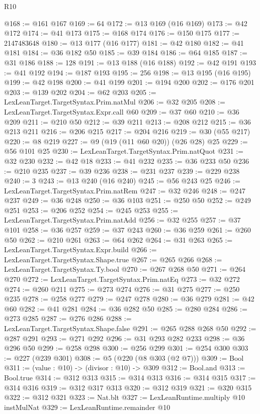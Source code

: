 \begin{lexlean}{R10}
\begin{coremodule}
@168 := @161 @167
@169 := 64
@172 := @13 @169 (@16 @169)
@173 := @42 @172
@174 := @41 @173
@175 := @168 @174
@176 := @150 @175
@177 := 2147483648
@180 := @13 @177 (@16 @177)
@181 := @42 @180
@182 := @41 @181
@184 := @36 @182 @50
@185 := @39 @184
@186 := @64 @185
@187 := @31 @186
@188 := 128
@191 := @13 @188 (@16 @188)
@192 := @42 @191
@193 := @41 @192
@194 := @187 @193
@195 := 256
@198 := @13 @195 (@16 @195)
@199 := @42 @198
@200 := @41 @199
@201 := @194 @200
@202 := @176 @201
@203 := @139 @202
@204 := @62 @203
@205 := LexLeanTarget.TargetSyntax.Prim.natMul
@206 := @32 @205
@208 := LexLeanTarget.TargetSyntax.Expr.call @60
@209 := @37 @60
@210 := @36 @209
@211 := @210 @50
@212 := @39 @211
@213 := @208 @212
@215 := @36 @213 @211
@216 := @206 @215
@217 := @204 @216
@219 := @30 (@55 @217)
@220 := @8 @219
@227 := @9 (@19 (@11 @60 @20)) (@26 @28) @25
@229 := @56 @101 @25
@230 := LexLeanTarget.TargetSyntax.Prim.natQuot
@231 := @32 @230
@232 := @42 @18
@233 := @41 @232
@235 := @36 @233 @50
@236 := @210 @235
@237 := @39 @236
@238 := @231 @237
@239 := @229 @238
@240 := 3
@243 := @13 @240 (@16 @240)
@245 := @56 @243 @25
@246 := LexLeanTarget.TargetSyntax.Prim.natRem
@247 := @32 @246
@248 := @247 @237
@249 := @36 @248
@250 := @36 @103
@251 := @250 @50
@252 := @249 @251
@253 := @206 @252
@254 := @245 @253
@255 := LexLeanTarget.TargetSyntax.Prim.natAdd
@256 := @32 @255
@257 := @37 @101
@258 := @36 @257
@259 := @37 @243
@260 := @36 @259
@261 := @260 @50
@262 := @210 @261
@263 := @64 @262
@264 := @31 @263
@265 := LexLeanTarget.TargetSyntax.Expr.build
@266 := LexLeanTarget.TargetSyntax.Shape.true
@267 := @265 @266
@268 := LexLeanTarget.TargetSyntax.Ty.bool
@270 := @267 @268 @50
@271 := @264 @270
@272 := LexLeanTarget.TargetSyntax.Prim.natEq
@273 := @32 @272
@274 := @260 @211
@275 := @273 @274
@276 := @31 @275
@277 := @250 @235
@278 := @258 @277
@279 := @247 @278
@280 := @36 @279
@281 := @42 @60
@282 := @41 @281
@284 := @36 @282 @50
@285 := @280 @284
@286 := @273 @285
@287 := @276 @286
@288 := LexLeanTarget.TargetSyntax.Shape.false
@291 := @265 @288 @268 @50
@292 := @287 @291
@293 := @271 @292
@296 := @31 @293 @282 @233
@298 := @36 @296 @50
@299 := @258 @298
@300 := @256 @299
@301 := @254 @300
@303 := @227 (@239 @301)
@308 := @5 (@220 (@8 @303 (@2 @7)))
@309 := Bool
@311 := (value : @10) -> (divisor : @10) -> @309
@312 := Bool.and
@313 := Bool.true
@314 := @312 @313
@315 := @314 @313
@316 := @314 @315
@317 := @314 @316
@319 := @312 @317 @313
@320 := @312 @319
@321 := @320 @315
@322 := @312 @321
@323 := Nat.blt
@327 := LexLeanRuntime.multiply @10 instMulNat
@329 := LexLeanRuntime.remainder @10

\end{coremodule}
\end{lexlean}
